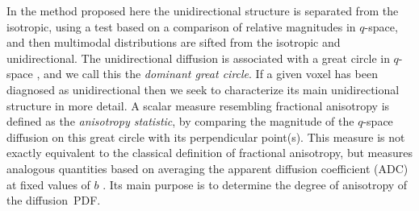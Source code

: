\documentclass[dvips,aoas,preprint]{imsart}
\numberwithin{equation}{section}
\theoremstyle{plain}
\begin{document}

In the method proposed here the unidirectional structure is separated
from the isotropic, using a test based on a comparison of relative
magnitudes in $q$-space, and then multimodal distributions are sifted
from the isotropic and unidirectional.  The unidirectional diffusion
is associated with a great circle in $q$-space \citep{Tuch}, and we
call this the {\em dominant great circle}.  If a given voxel has been
diagnosed as unidirectional then we seek to characterize its main
unidirectional structure in more detail.  A scalar measure resembling
fractional anisotropy \citep{bas:FA} is defined as the {\em anisotropy
  statistic}, by comparing the magnitude of the $q$-space diffusion on
this great circle with its perpendicular point(s).  This measure is
not exactly equivalent to the classical definition of fractional
anisotropy, but measures analogous quantities based on averaging the
apparent diffusion coefficient (ADC) at fixed values of $b$
\citep{fra:anisotropy}.  Its main purpose is to determine the degree
of anisotropy of the diffusion~PDF.
\end{document}
